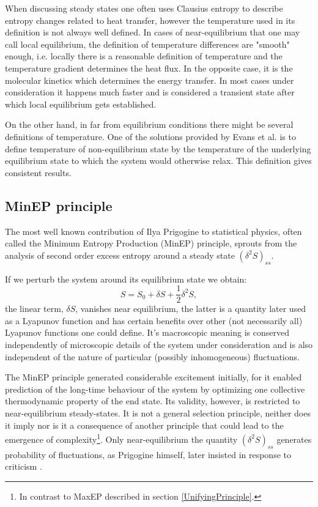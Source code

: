 \documentclass[a4paper,12pt]{article}
\begin{document}
When discussing steady states one often uses Clausius entropy to describe entropy changes related to heat transfer, however the temperature used in its definition is not always well defined. In cases of near-equilibrium that one may call local equilibrium, the definition of temperature differences are "smooth" enough, i.e. locally there is a reasonable definition of temperature and the temperature gradient determines the heat flux. 
In the opposite case, it is the molecular kinetics which determines the energy transfer. In most cases under consideration it happens much faster and is considered a transient state after which local equilibrium gets established.

On the other hand, in far from equilibrium conditions there might be several definitions of temperature. One of the solutions provided by Evans et al. \cite{Evans:2241458} is to define temperature of non-equilibrium state by the temperature of the underlying equilibrium state to which the system would otherwise relax. This definition gives consistent results.

\subsection{MinEP principle}

The most well known contribution of Ilya Prigogine to statistical physics, often called the Minimum Entropy Production (MinEP) principle, sprouts from the analysis of second order excess entropy around a steady state $ (\delta^2 S)_{ss} $. 

If we perturb the system around its equilibrium state we obtain:
\begin{equation}
  S=S_0 + \delta S + \frac{1}{2}\delta^2 S,
\end{equation}
the linear term, $\delta S$, vanishes near equilibrium, the latter is a quantity later used as a Lyapunov function and has certain benefits over other (not necessarily all) Lyapunov functions one could define. 
It's macroscopic meaning is conserved independently of microscopic details of the system under consideration and is also independent of the nature of particular (possibly inhomogeneous) fluctuations.

The MinEP principle generated considerable excitement initially, for it enabled prediction of the long-time behaviour of the system by optimizing one collective thermodynamic property of the end state. Its validity, however, is restricted to near-equilibrium steady-states. It is not a general selection principle, neither does it imply nor is it a consequence of another principle that could lead to the emergence of complexity\footnote{In contrast to MaxEP described in section \ref{UnifyingPrinciple}.}. 
Only near-equilibrium the quantity $ (\delta^2 S)_{ss} $ generates probability of fluctuations, as Prigogine himself, later insisted in response to criticism \cite{Nicolis:1979cv}.
\end{document}
